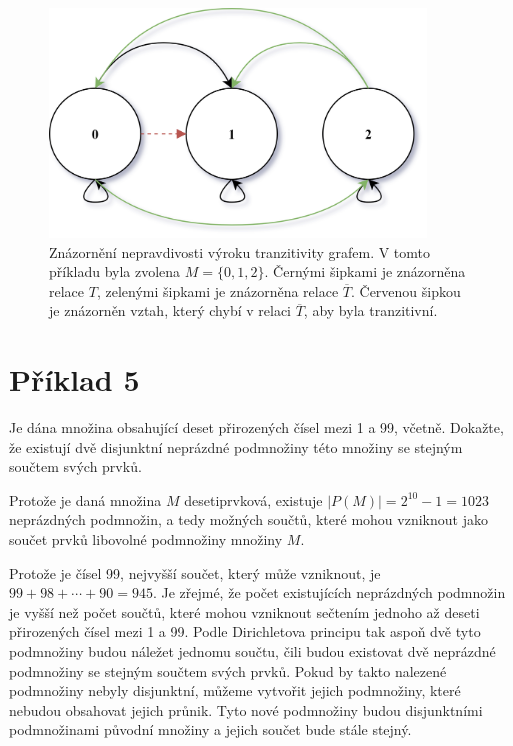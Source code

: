 \documentclass[12pt,a4paper]{article}
\newcommand{\pageline}{\noindent\makebox[\linewidth]{\rule{\linewidth}{0.4pt}}\vspace{5pt}}
\begin{document}
\begin{figure}[h]
 \centering
 \includegraphics[width=10cm]{diagram.png}
 \caption{Znázornění nepravdivosti výroku tranzitivity grafem. V tomto příkladu byla zvolena \(M=\{0,1,2\}\). Černými šipkami je znázorněna relace $T$, zelenými šipkami je znázorněna relace \(\overline{T}\). Červenou šipkou je znázorněn vztah, který chybí v relaci \(\overline{T}\), aby byla tranzitivní.}
\end{figure}

\section*{Příklad 5}
Je dána množina obsahující deset přirozených čísel mezi 1 a 99, včetně. Dokažte, že existují dvě disjunktní neprázdné podmnožiny této množiny se stejným součtem svých prvků.

\pageline

Protože je daná množina $M$ desetiprvková, existuje $|P(M)| = 2^{10}-1 = 1023$ neprázdných podmnožin, a tedy možných součtů, které mohou vzniknout jako součet prvků libovolné podmnožiny množiny $M$.

Protože je čísel 99, nejvyšší součet, který může vzniknout, je $99+98+\cdots+90=945$. Je zřejmé, že počet existujících neprázdných podmnožin je vyšší než počet součtů, které mohou vzniknout sečtením jednoho až deseti přirozených čísel mezi 1 a 99. Podle Dirichletova principu tak aspoň dvě tyto podmnožiny budou náležet jednomu součtu, čili budou existovat dvě neprázdné podmnožiny se stejným součtem svých prvků. Pokud by takto nalezené podmnožiny nebyly disjunktní, můžeme vytvořit jejich podmnožiny, které nebudou obsahovat jejich průnik. Tyto nové podmnožiny budou disjunktními podmnožinami původní množiny a jejich součet bude stále stejný.
\end{document}
